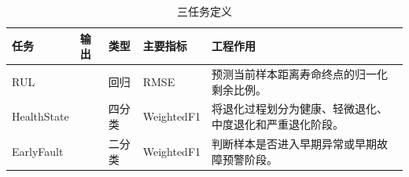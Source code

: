 \begin{table}[H]
\centering
\caption{三任务定义}
\label{tab:task-definitions}
\small
\begin{tabularx}{\textwidth}{p{2.5cm}p{3.2cm}p{2.0cm}p{2.8cm}Y}
\toprule
任务 & 输出 & 类型 & 主要指标 & 工程作用 \\
\midrule
RUL &  & 回归 & RMSE & 预测当前样本距离寿命终点的归一化剩余比例。 \\
HealthState &  & 四分类 & WeightedF1 & 将退化过程划分为健康、轻微退化、中度退化和严重退化阶段。 \\
EarlyFault &  & 二分类 & WeightedF1 & 判断样本是否进入早期异常或早期故障预警阶段。 \\
\bottomrule
\end{tabularx}
\end{table}
